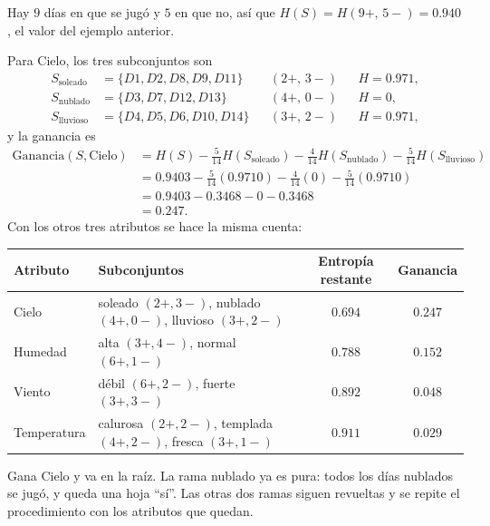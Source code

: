 \documentclass[11pt,letterpaper]{article}
\begin{document}
 Hay $9$ días en que se
jugó y $5$ en que no, así que $H(S) = H(9+,\,5-) = 0.940$, el valor del
ejemplo anterior.

 Para Cielo, los
tres subconjuntos son
\begin{align*}
    S_{\text{soleado}}  &= \{D1, D2, D8, D9, D11\}
        && (2+,\,3-) && H = 0.971 , \\
    S_{\text{nublado}}  &= \{D3, D7, D12, D13\}
        && (4+,\,0-) && H = 0 , \\
    S_{\text{lluvioso}} &= \{D4, D5, D6, D10, D14\}
        && (3+,\,2-) && H = 0.971 ,
\end{align*}
y la ganancia es
\begin{align*}
    \text{Ganancia}(S, \text{Cielo})
        &= H(S) - \tfrac{5}{14} H(S_{\text{soleado}})
                - \tfrac{4}{14} H(S_{\text{nublado}})
                - \tfrac{5}{14} H(S_{\text{lluvioso}}) \\
        &= 0.9403 - \tfrac{5}{14}(0.9710) - \tfrac{4}{14}(0)
                  - \tfrac{5}{14}(0.9710) \\
        &= 0.9403 - 0.3468 - 0 - 0.3468 \\
        &= 0.247 .
\end{align*}
Con los otros tres atributos se hace la misma cuenta:
\begin{center}
\small
\begin{tabular}{llcc}
    \toprule
    \textbf{Atributo} & \textbf{Subconjuntos}
        & \textbf{Entropía restante} & \textbf{Ganancia} \\
    \midrule
    Cielo & soleado $(2+,3-)$, nublado $(4+,0-)$, lluvioso $(3+,2-)$
          & $0.694$ & $\mathbf{0.247}$ \\
    Humedad & alta $(3+,4-)$, normal $(6+,1-)$
            & $0.788$ & $0.152$ \\
    Viento & débil $(6+,2-)$, fuerte $(3+,3-)$
           & $0.892$ & $0.048$ \\
    Temperatura & calurosa $(2+,2-)$, templada $(4+,2-)$,
                  fresca $(3+,1-)$ & $0.911$ & $0.029$ \\
    \bottomrule
\end{tabular}
\end{center}
Gana Cielo y va en la raíz. La rama nublado ya es pura: todos los días
nublados se jugó, y queda una hoja ``sí''. Las otras dos ramas siguen
revueltas y se repite el procedimiento con los atributos que quedan.
\end{document}
